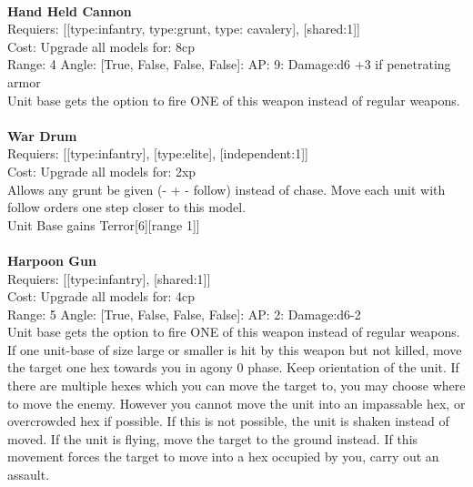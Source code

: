 \ \\
{\bf Hand Held Cannon } \\

Requiers: [[type:infantry, type:grunt, type: cavalery], [shared:1]] \\
Cost: Upgrade all models for: 8cp \\


Range: 4  Angle: [True, False, False, False]: AP: 9: Damage:d6 +3 if penetrating armor \\
Unit base gets the option to fire ONE of this weapon instead of regular weapons.\\ 








\ \\
{\bf War Drum } \\

Requiers: [[type:infantry], [type:elite], [independent:1]] \\
Cost: Upgrade all models for: 2xp \\
Allows any grunt be given (- + - follow) instead of chase. Move each unit with follow orders one step closer to this model.\\ 
Unit Base gains Terror[6][range 1]]\\ 









\ \\
{\bf Harpoon Gun } \\

Requiers: [[type:infantry], [shared:1]] \\
Cost: Upgrade all models for: 4cp \\


Range: 5  Angle: [True, False, False, False]: AP: 2: Damage:d6-2 \\
Unit base gets the option to fire ONE of this weapon instead of regular weapons.\\ 
If one unit-base of size large or smaller is hit by this weapon but not killed, move the target one hex towards you in agony 0 phase. Keep orientation of the unit. If there are multiple hexes which you can move the target to, you may choose where to move the enemy. However you cannot move the unit into an impassable hex, or overcrowded hex if possible. If this is not possible, the unit is shaken instead of moved. If the unit is flying, move the target to the ground instead. If this movement forces the target to move into a hex occupied by you, carry out an assault.\\ 








